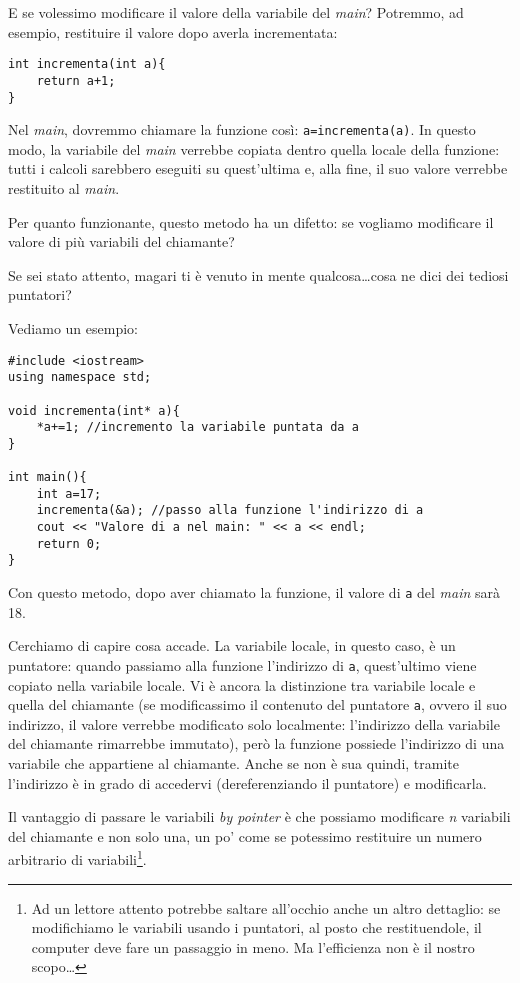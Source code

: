 E se volessimo modificare il valore della variabile del \emph{main}? 
Potremmo, ad esempio, restituire il valore dopo averla incrementata:
\begin{lstlisting}
int incrementa(int a){
	return a+1;
}
\end{lstlisting}
Nel \emph{main}, dovremmo chiamare la funzione così: \lstinline|a=incrementa(a)|. In questo modo, la variabile del \emph{main} verrebbe copiata dentro quella locale della funzione: tutti i calcoli sarebbero eseguiti su quest'ultima e, alla fine, il suo valore verrebbe restituito al \emph{main}. 

Per quanto funzionante, questo metodo ha un difetto: se vogliamo modificare il valore di più variabili del chiamante?

Se sei stato attento, magari ti è venuto in mente qualcosa\ldots cosa ne dici dei tediosi puntatori?

Vediamo un esempio:
\begin{lstlisting}
#include <iostream>
using namespace std;

void incrementa(int* a){
	*a+=1; //incremento la variabile puntata da a
}

int main(){
	int a=17;
	incrementa(&a); //passo alla funzione l'indirizzo di a
	cout << "Valore di a nel main: " << a << endl;
	return 0;
}
\end{lstlisting}

Con questo metodo, dopo aver chiamato la funzione, il valore di \verb|a| del \emph{main} sarà 18. 

Cerchiamo di capire cosa accade. La variabile locale, in questo caso, è un puntatore: quando passiamo alla funzione l'indirizzo di \verb|a|, quest'ultimo viene copiato nella variabile locale. Vi è ancora la distinzione tra variabile locale e  quella del chiamante (se modificassimo il contenuto del puntatore \verb|a|, ovvero il suo indirizzo, il valore verrebbe modificato solo localmente: l'indirizzo della variabile del chiamante rimarrebbe immutato), però la funzione possiede l'indirizzo di una variabile che appartiene al chiamante. Anche se non è sua quindi, tramite l'indirizzo è in grado di accedervi (dereferenziando il puntatore) e modificarla. 

Il vantaggio di passare le variabili \emph{by pointer} è che possiamo modificare \emph{n} variabili del chiamante e non solo una, un po' come se potessimo restituire un numero arbitrario di variabili\footnote{Ad un lettore attento potrebbe saltare all'occhio anche un altro dettaglio: se modifichiamo le variabili usando i puntatori, al posto che restituendole, il computer deve fare un passaggio in meno. Ma l'efficienza non è il nostro scopo\ldots}.\\


